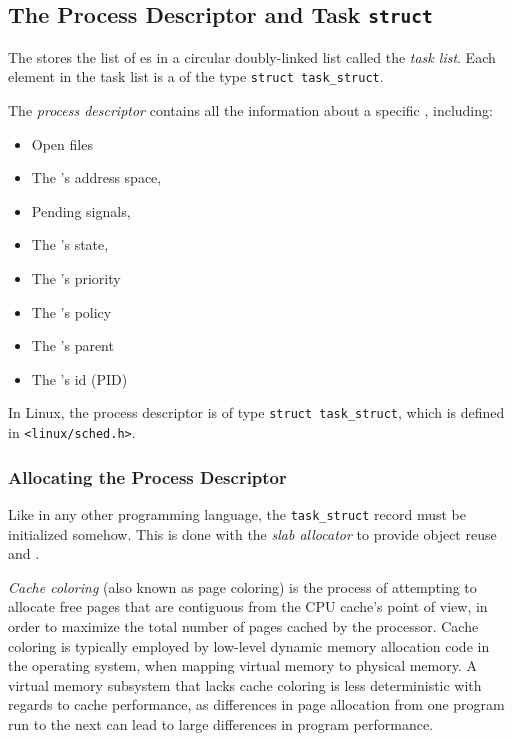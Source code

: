 \subsection{The Process Descriptor and Task \texttt{struct}}\label{subsec:Process_Descriptor_Task_Struct}
\begin{definition}\label{def:Task_List}
  The  stores the list of es in a circular doubly-linked list called the \emph{task list}.
  Each element in the task list is a  of the type \texttt{struct task_struct}.
\end{definition}

\begin{definition}\label{def:Process_Descriptor}
  The \emph{process descriptor} contains all the information about a specific , including:
  \begin{itemize}[noitemsep]
  \item Open files
  \item The ’s address space,
  \item Pending signals,
  \item The ’s state,
  \item The 's priority
  \item The 's policy
  \item The 's parent
  \item The 's id (PID)
  \end{itemize}

  In Linux, the process descriptor is of type \texttt{struct task_struct}, which is defined in \texttt{<linux/sched.h>}.
\end{definition}

\subsubsection{Allocating the Process Descriptor}\label{subsubsec:Allocate_Process_Descriptor}
Like in any other programming language, the \texttt{task_struct} record must be initialized somehow.
This is done with the \emph{slab allocator} to provide object reuse and .

\begin{definition}\label{def:Cache_Coloring}
  \emph{Cache coloring} (also known as page coloring) is the process of attempting to allocate free pages that are contiguous from the CPU cache's point of view, in order to maximize the total number of pages cached by the processor.
  Cache coloring is typically employed by low-level dynamic memory allocation code in the operating system, when mapping virtual memory to physical memory.
  A virtual memory subsystem that lacks cache coloring is less deterministic with regards to cache performance, as differences in page allocation from one program run to the next can lead to large differences in program performance.
\end{definition}

